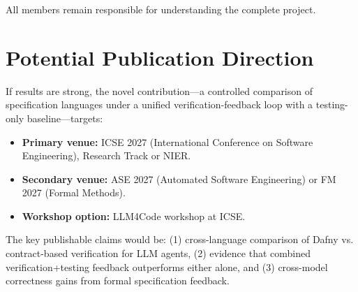 \documentclass[11pt,a4paper]{article}
\begin{document}
All members remain responsible for understanding the complete project.

\section{Potential Publication Direction}

If results are strong, the novel contribution---a controlled comparison of specification languages under a unified verification-feedback loop with a testing-only baseline---targets:

\begin{itemize}[noitemsep]
    \item \textbf{Primary venue:} ICSE 2027 (International Conference on Software Engineering), Research Track or NIER.
    \item \textbf{Secondary venue:} ASE 2027 (Automated Software Engineering) or FM 2027 (Formal Methods).
    \item \textbf{Workshop option:} LLM4Code workshop at ICSE.
\end{itemize}

The key publishable claims would be: (1) cross-language comparison of Dafny vs. contract-based verification for LLM agents, (2) evidence that combined verification+testing feedback outperforms either alone, and (3) cross-model correctness gains from formal specification feedback.

\newpage

\end{document}
